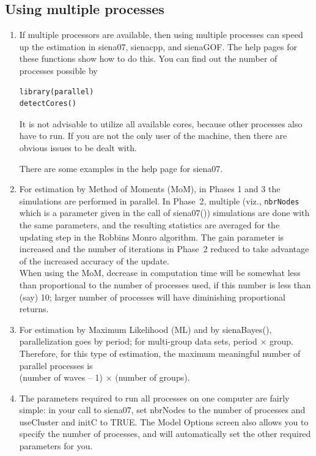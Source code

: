 \documentclass[a4paper,fleqn,11pt]{article}
\newcommand{\+}{\, + \,}
\newcommand{\sfn}[1]{\textsf{#1}}
\begin{document}
\subsection{Using multiple processes}
\label{S_multipleProcesses}
\begin{enumerate}
\item
  If multiple processors are available, then using
  multiple processes can speed up the estimation in \sfn{siena07},
  \sfn{sienacpp}, and \sfn{sienaGOF}.
  The help pages for these functions show how to do this.
  You can find out the number of processes possible by
\begin{verbatim}
library(parallel)
detectCores()
\end{verbatim}
  It is not advisable to utilize all available cores, because
  other processes also have to run. If you are not the only user
  of the machine, then there are obvious issues to be dealt with.

  There are some examples in the help page for \sfn{siena07}.
\item For estimation by Method of Moments (MoM), in Phases 1 and 3
  the simulations are performed in parallel. In Phase~2,
  multiple (viz., \texttt{nbrNodes} which is a parameter
  given in the call of \sfn{siena07()}) simulations are done with the same parameters,
  and the resulting statistics are averaged for the updating step in the
  Robbins Monro algorithm. The gain parameter is increased and the
  number of iterations in Phase~2 reduced to take advantage of
  the increased accuracy of the update.\\
  When using the MoM, decrease in computation time will be somewhat less
  than proportional to the number of processes used, if this number is less than
  (say) 10; larger number of processes will have diminishing proportional
  returns.

\item For estimation by Maximum Likelihood (ML) and by \sfn{sienaBayes()},
  parallelization goes by period; for multi-group data sets, period $\times$
  group. Therefore, for this type of estimation, the maximum meaningful number
  of parallel processes is \\ (number of waves -- 1) $\times$ (number of groups).

\item The parameters required to run all processes on one computer are fairly
  simple: in your call to \sfn{siena07}, set \sfn{nbrNodes} to the number of
  processes and \sfn{useCluster} and \sfn{initC} to TRUE. The \sfn{Model
    Options} screen also allows you to specify the number of processes, and
  will automatically set the other required parameters for you.


\end{enumerate}
\end{document}

